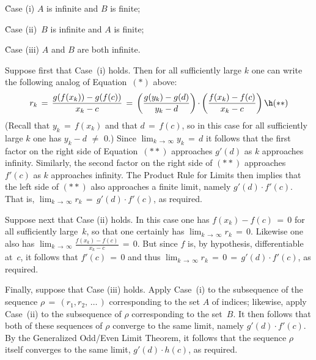 \VA

        \h Case (i)\,\,$A$ is infinite and $B$ is finite;

        \h Case (ii)\, $B$ is infinite and $A$ is finite;

        \h Case (iii) $A$ and $B$ are both infinite.

\VA

        Suppose first that Case~(i) holds. Then for all sufficiently large $k$ one can write the following analog of Equation~$({\ast})$ above:
        \begin{displaymath}
        r_{k} \,=\, \frac{g(f(x_{k}))-g(f(c))}{x_{k}-c} \,=\, 
    \left(\frac{g(y_{k})-g(d)}{y_{k}-d}\right) {\cdot}
    \left(\frac{f(x_{k})-f(c)}{x_{k}-c}\right) \h ({\ast}{\ast})
        \end{displaymath}
    (Recall that $y_{k} \,=\, f(x_{k})$ and that $d \,=\, f(c)$, so in this case for all sufficiently large $k$ one has $y_{k}-d \,\,{\neq}\,\, 0$.)
    Since $\lim_{k \,{\rightarrow}\, {\infty}} y_{k} \,=\, d$ it follows that the first factor
    on the right side of Equation~$({\ast}{\ast})$ approaches $g'(d)$ as $k$ approaches infinity.
    Similarly, the second factor on the right side  of $({\ast}{\ast})$ approaches $f'(c)$ as $k$ approaches infinity.
    The Product Rule for Limits then implies that the left side of $({\ast}{\ast})$ also approaches a finite limit, namely $g'(d){\cdot}f'(c)$.
    That is, ${\displaystyle \lim_{k \,{\rightarrow}\, {\infty}} r_{k} \,=\, g'(d){\cdot}f'(c)}$, as required.

        Suppose next that Case (ii) holds. In this case one has $f(x_{k})-f(c) \,=\, 0$ for all sufficiently large~$k$,
    so that one certainly has $\lim_{k \,{\rightarrow}\, {\infty}} r_{k} \,=\, 0$.
    Likewise one also has ${\displaystyle \lim_{k \,{\rightarrow}\, {\infty}} \frac{f(x_{k}) - f(c)}{x_{k}-c} \,=\, 0}$.
    But since $f$ is, by hypothesis, differentiable at~$c$, it follows that $f'(c) \,=\, 0$
    and thus $\lim_{k \,{\rightarrow}\, {\infty}} r_{k} \,=\, 0 \,=\, g'(d){\cdot}f'(c)$, as required.

        Finally, suppose that Case (iii) holds. Apply Case~(i) to the subsequence of the sequence
    ${\rho} \,=\, (r_{1}, r_{2},\,{\ldots}\,)$ corresponding to the set $A$ of indices;
    likewise, apply Case~(ii) to the subsequence of ${\rho}$ corresponding to the set~$B$.
    It then follows that both of these sequences of ${\rho}$ converge to the same limit, namely $g'(d) {\cdot} f'(c)$.
    By the Generalized Odd/Even Limit Theorem, it follows that the sequence ${\rho}$ itself converges to the same limit, $g'(d){\cdot}h(c)$, as required.

